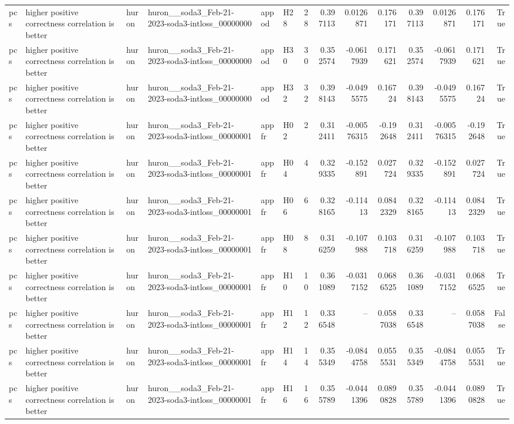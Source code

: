 \begin{longtable}{llllllrrrrrrrr}
pcs & higher positive correctness correlation is better & huron & huron\_\_soda3\_Feb-21-2023-soda3-intloss\_00000000 & appod & H28 & 28 & 0.397113 & 0.0126871 & 0.176171 & 0.397113 & 0.0126871 & 0.176171 & True \\
pcs & higher positive correctness correlation is better & huron & huron\_\_soda3\_Feb-21-2023-soda3-intloss\_00000000 & appod & H30 & 30 & 0.352574 & -0.0617939 & 0.171621 & 0.352574 & -0.0617939 & 0.171621 & True \\
pcs & higher positive correctness correlation is better & huron & huron\_\_soda3\_Feb-21-2023-soda3-intloss\_00000000 & appod & H32 & 32 & 0.398143 & -0.0495575 & 0.16724 & 0.398143 & -0.0495575 & 0.16724 & True \\
pcs & higher positive correctness correlation is better & huron & huron\_\_soda3\_Feb-21-2023-soda3-intloss\_00000001 & appfr & H02 & 2 & 0.312411 & -0.00576315 & -0.192648 & 0.312411 & -0.00576315 & -0.192648 & True \\
pcs & higher positive correctness correlation is better & huron & huron\_\_soda3\_Feb-21-2023-soda3-intloss\_00000001 & appfr & H04 & 4 & 0.329335 & -0.152891 & 0.027724 & 0.329335 & -0.152891 & 0.027724 & True \\
pcs & higher positive correctness correlation is better & huron & huron\_\_soda3\_Feb-21-2023-soda3-intloss\_00000001 & appfr & H06 & 6 & 0.328165 & -0.11413 & 0.0842329 & 0.328165 & -0.11413 & 0.0842329 & True \\
pcs & higher positive correctness correlation is better & huron & huron\_\_soda3\_Feb-21-2023-soda3-intloss\_00000001 & appfr & H08 & 8 & 0.316259 & -0.107988 & 0.103718 & 0.316259 & -0.107988 & 0.103718 & True \\
pcs & higher positive correctness correlation is better & huron & huron\_\_soda3\_Feb-21-2023-soda3-intloss\_00000001 & appfr & H10 & 10 & 0.361089 & -0.0317152 & 0.0686525 & 0.361089 & -0.0317152 & 0.0686525 & True \\
pcs & higher positive correctness correlation is better & huron & huron\_\_soda3\_Feb-21-2023-soda3-intloss\_00000001 & appfr & H12 & 12 & 0.336548 & -- & 0.0587038 & 0.336548 & -- & 0.0587038 & False \\
pcs & higher positive correctness correlation is better & huron & huron\_\_soda3\_Feb-21-2023-soda3-intloss\_00000001 & appfr & H14 & 14 & 0.355349 & -0.0844758 & 0.0555531 & 0.355349 & -0.0844758 & 0.0555531 & True \\
pcs & higher positive correctness correlation is better & huron & huron\_\_soda3\_Feb-21-2023-soda3-intloss\_00000001 & appfr & H16 & 16 & 0.355789 & -0.0441396 & 0.0890828 & 0.355789 & -0.0441396 & 0.0890828 & True \\

\end{longtable}
